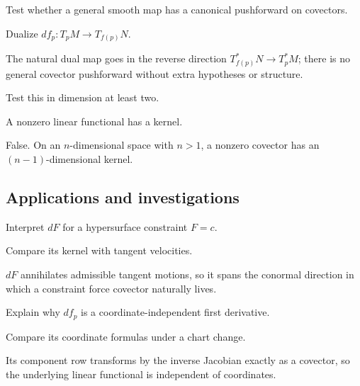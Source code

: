 \begin{exercise}\label{exr:vii05-ped-11}
Test whether a general smooth map has a canonical pushforward on covectors.
\end{exercise}
\begin{hint}
Dualize \(df_p:T_pM\to T_{f(p)}N\).
\end{hint}
\begin{solution}
The natural dual map goes in the reverse direction \(T^*_{f(p)}N\to T_p^*M\); there is no general covector pushforward without extra hypotheses or structure.
\end{solution}

\begin{exercise}\label{exr:vii05-ped-12}
Test this in dimension at least two.
\end{exercise}
\begin{hint}
A nonzero linear functional has a kernel.
\end{hint}
\begin{solution}
False.  On an \(n\)-dimensional space with \(n>1\), a nonzero covector has an \((n-1)\)-dimensional kernel.
\end{solution}

\subsection*{Applications and investigations}

\begin{exercise}\label{exr:vii05-ped-13}
Interpret \(dF\) for a hypersurface constraint \(F=c\).
\end{exercise}
\begin{hint}
Compare its kernel with tangent velocities.
\end{hint}
\begin{solution}
\(dF\) annihilates admissible tangent motions, so it spans the conormal direction in which a constraint force covector naturally lives.
\end{solution}

\begin{exercise}\label{exr:vii05-ped-14}
Explain why \(df_p\) is a coordinate-independent first derivative.
\end{exercise}
\begin{hint}
Compare its coordinate formulas under a chart change.
\end{hint}
\begin{solution}
Its component row transforms by the inverse Jacobian exactly as a covector, so the underlying linear functional is independent of coordinates.
\end{solution}

